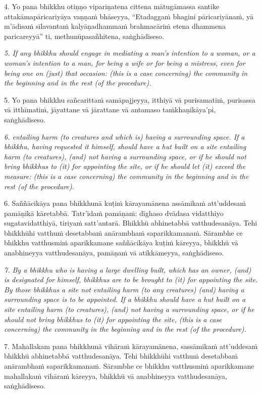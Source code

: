 \documentclass[11pt]{article}
\begin{document}
\begin{paracol}{2}
\begin{column}
\begin{flushleft}
4. Yo pana bhikkhu otiṇṇo vipariṇatena cittena mātugāmassa santike attakāmapāricariyāya vaṇṇaṁ bhāseyya, “Etadaggaṁ bhagini pāricariyānaṁ, yā m’ādisaṁ sīlavantaṁ kalyāṇadhammaṁ brahmacāriṁ etena dhammena paricareyyā” ti, methunūpasañhitena, saṅghādiseso.
\switchcolumn*
\end{flushleft}

{\itshape\footnotesize
5. If any bhikkhu should engage in mediating a man's intention to a woman, or a woman's intention to a man, for being a wife or for being a mistress, even for being one on (just) that occasion: (this is a case concerning) the community in the beginning and in the rest (of the procedure).
}
\switchcolumn

\begin{flushleft}
5. Yo pana bhikkhu sañcarittaṁ samāpajjeyya, itthiyā vā purisamatiṁ, purisassa vā itthīmatiṁ, jāyattane vā jārattane vā antamaso taṁkhaṇikāya’pi, saṅghādiseso.
\switchcolumn*
\end{flushleft}

{\itshape\footnotesize
6. entailing harm (to creatures and which is) having a surrounding space. If a bhikkhu, having requested it himself, should have a hut built on a site entailing harm (to creatures), (and) not having a surrounding space, or if he should not bring bhikkhus to (it) for appointing the site, or if he should let (it) exceed the measure: (this is a case concerning) the community in the beginning and in the rest (of the procedure).
}
\switchcolumn

\begin{flushleft}
6. Saññācikāya pana bhikkhunā kuṭiṁ kārayamānena assāmikaṁ att’uddesaṁ pamāṇikā kāretabbā. Tatr’idaṁ pamāṇaṁ: dīghaso dvādasa vidatthiyo sugatavidatthiyā, tiriyaṁ satt’antarā. Bhikkhū abhinetabbā vatthudesanāya. Tehi bhikkhūhi vatthuṁ desetabbaṁ anārambhaṁ saparikkamanaṁ. Sārambhe ce bhikkhu vatthusmiṁ aparikkamane saññācikāya kuṭiṁ kāreyya, bhikkhū vā anabhineyya vatthudesanāya, pamāṇaṁ vā atikkāmeyya, saṅghādiseso.
\switchcolumn*
\end{flushleft}

{\itshape\footnotesize
7. By a bhikkhu who is having a large dwelling built, which has an owner, (and) is designated for himself, bhikkhus are to be brought to (it) for appointing the site. By those bhikkhus a site not entailing harm (to any creatures) (and) having a surrounding space is to be appointed. If a bhikkhu should have a hut built on a site entailing harm (to creatures), (and) not having a surrounding space, or if he should not bring bhikkhus to (it) for appointing the site, (this is a case concerning) the community in the beginning and in the rest (of the procedure).
}
\switchcolumn
\begin{flushleft}
7. Mahallakam pana bhikkhunā vihāraṁ kārayamānena, sassāmikaṁ att’uddesaṁ bhikkhū abhinetabbā vatthudesanāya. Tehi bhikkhūhi vatthuṁ desetabbaṁ anārambhaṁ saparikkamanaṁ. Sārambhe ce bhikkhu vatthusmiṁ aparikkamane mahallakaṁ vihāraṁ kāreyya, bhikkhū vā anabhineyya vatthudesanāya, saṅghādiseso.


\end{flushleft}
\end{column}
\end{paracol}
\end{document}
